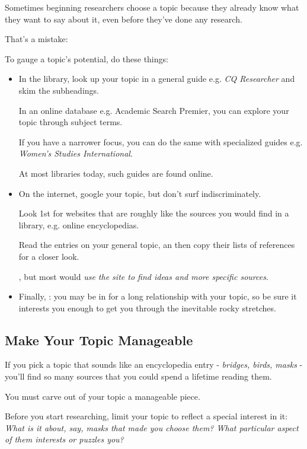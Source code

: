 \documentclass[oneside]{book}
\numberwithin{equation}{section}
\begin{document}
Sometimes beginning researchers choose a topic because they already know what they want to say about it, even before they've done any research.

That's a mistake: 

To gauge a topic's potential, do these things:
\begin{itemize}
    \item In the library, look up your topic in a general guide e.g. \textit{CQ Researcher} and skim the subheadings.
    
    In an online database e.g. Academic Search Premier, you can explore your topic through subject terms.
    
    If you have a narrower focus, you can do the same with specialized guides e.g. \textit{Women's Studies International}.
    
    At most libraries today, such guides are found online.
    \item On the internet, google your topic, but don't surf indiscriminately.
    
    Look 1st for websites that are roughly like the sources you would find in a library, e.g. online encyclopedias.
    
    Read the entries on your general topic, an then copy their lists of references for a closer look.
    
    , but most would \textit{use the site to find ideas and more specific sources}.
    \item Finally, : you may be in for a long relationship with your topic, so be sure it interests you enough to get you through the inevitable rocky stretches.
\end{itemize}

\subsection{Make Your Topic Manageable}
If you pick a topic that sounds like an encyclopedia entry - \textit{bridges, birds, masks} - you'll find so many sources that you could spend a lifetime reading them.

You must carve out of your topic a manageable piece.

Before you start researching, limit your topic to reflect a special interest in it: \textit{What is it about, say, masks that made you choose them? What particular aspect of them interests or puzzles you?}
\end{document}
